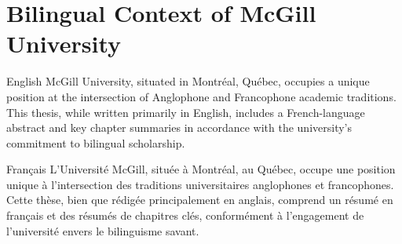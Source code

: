 \section{Bilingual Context of McGill University}

\begin{bilingualblock}{English}{%
McGill University, situated in Montr\'eal, Qu\'ebec, occupies a unique position at the intersection of Anglophone and Francophone academic traditions. This thesis, while written primarily in English, includes a French-language abstract and key chapter summaries in accordance with the university's commitment to bilingual scholarship.}
\end{bilingualblock}

\begin{bilingualblock}{Fran\c{c}ais}{%
L'Universit\'e McGill, situ\'ee \`a Montr\'eal, au Qu\'ebec, occupe une position unique \`a l'intersection des traditions universitaires anglophones et francophones. Cette th\`ese, bien que r\'edig\'ee principalement en anglais, comprend un r\'esum\'e en fran\c{c}ais et des r\'esum\'es de chapitres cl\'es, conform\'ement \`a l'engagement de l'universit\'e envers le bilinguisme savant.}
\end{bilingualblock}
